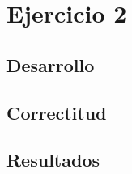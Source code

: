 
	\section{Ejercicio 2}

    \subsection{Desarrollo}

    \pagebreak

    \subsection{Correctitud}
	

    \pagebreak


    \subsection{Resultados}

    \pagebreak
